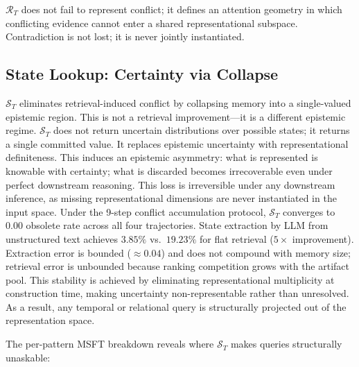 \documentclass[letterpaper,twocolumn,10pt]{article}
\begin{document}
$\mathcal{R}_T$ does not fail to represent conflict; it defines an attention geometry in which conflicting evidence cannot enter a shared representational subspace. Contradiction is not lost; it is never jointly instantiated.

\subsection{State Lookup: Certainty via Collapse}
$\mathcal{S}_T$ eliminates retrieval-induced conflict by collapsing memory into a single-valued epistemic region. This is not a retrieval improvement---it is a different epistemic regime. $\mathcal{S}_T$ does not return uncertain distributions over possible states; it returns a single committed value. It replaces epistemic uncertainty with representational definiteness. This induces an epistemic asymmetry: what is represented is knowable with certainty; what is discarded becomes irrecoverable even under perfect downstream reasoning. This loss is irreversible under any downstream inference, as missing representational dimensions are never instantiated in the input space. Under the 9-step conflict accumulation protocol, $\mathcal{S}_T$ converges to $0.00$ obsolete rate across all four trajectories. State extraction by LLM from unstructured text achieves $3.85\%$ vs.\ $19.23\%$ for flat retrieval ($5\times$ improvement). Extraction error is bounded ($\approx0.04$) and does not compound with memory size; retrieval error is unbounded because ranking competition grows with the artifact pool. This stability is achieved by eliminating representational multiplicity at construction time, making uncertainty non-representable rather than unresolved. As a result, any temporal or relational query is structurally projected out of the representation space.

The per-pattern MSFT breakdown reveals where $\mathcal{S}_T$ makes queries structurally unaskable:
\end{document}
